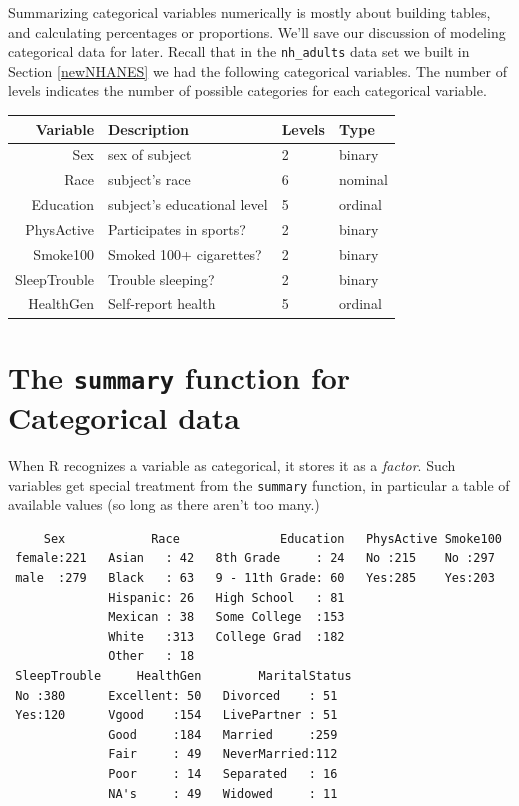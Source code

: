 \documentclass[
]{book}
\newenvironment{Shaded}{\begin{snugshade}}{\end{snugshade}}
\newcommand{\KeywordTok}[1]{\textcolor[rgb]{0.13,0.29,0.53}{\textbf{#1}}}
\newcommand{\NormalTok}[1]{#1}
\newcommand{\OperatorTok}[1]{\textcolor[rgb]{0.81,0.36,0.00}{\textbf{#1}}}
\newcommand{\StringTok}[1]{\textcolor[rgb]{0.31,0.60,0.02}{#1}}
\begin{document}
Summarizing categorical variables numerically is mostly about building tables, and calculating percentages or proportions. We'll save our discussion of modeling categorical data for later. Recall that in the \texttt{nh\_adults} data set we built in Section \ref{newNHANES} we had the following categorical variables. The number of levels indicates the number of possible categories for each categorical variable.

\begin{longtable}[]{@{}rlll@{}}
\toprule
Variable & Description & Levels & Type\tabularnewline
\midrule
\endhead
Sex & sex of subject & 2 & binary\tabularnewline
Race & subject's race & 6 & nominal\tabularnewline
Education & subject's educational level & 5 & ordinal\tabularnewline
PhysActive & Participates in sports? & 2 & binary\tabularnewline
Smoke100 & Smoked 100+ cigarettes? & 2 & binary\tabularnewline
SleepTrouble & Trouble sleeping? & 2 & binary\tabularnewline
HealthGen & Self-report health & 5 & ordinal\tabularnewline
\bottomrule
\end{longtable}

\hypertarget{the-summary-function-for-categorical-data}{%
\section{\texorpdfstring{The \texttt{summary} function for Categorical data}{The summary function for Categorical data}}\label{the-summary-function-for-categorical-data}}

When R recognizes a variable as categorical, it stores it as a \emph{factor}. Such variables get special treatment from the \texttt{summary} function, in particular a table of available values (so long as there aren't too many.)

\begin{Shaded}
\end{Shaded}

\begin{verbatim}
     Sex            Race              Education   PhysActive Smoke100 
 female:221   Asian   : 42   8th Grade     : 24   No :215    No :297  
 male  :279   Black   : 63   9 - 11th Grade: 60   Yes:285    Yes:203  
              Hispanic: 26   High School   : 81                       
              Mexican : 38   Some College  :153                       
              White   :313   College Grad  :182                       
              Other   : 18                                            
 SleepTrouble     HealthGen        MaritalStatus
 No :380      Excellent: 50   Divorced    : 51  
 Yes:120      Vgood    :154   LivePartner : 51  
              Good     :184   Married     :259  
              Fair     : 49   NeverMarried:112  
              Poor     : 14   Separated   : 16  
              NA's     : 49   Widowed     : 11  
\end{verbatim}
\end{document}
